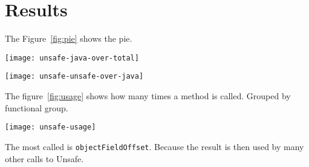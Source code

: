 
\section{Results} \label{sec:results}

The Figure~\ref{fig:pie} shows the pie.

\begin{figure*}[htb]
\centering
\vspace{-1cm}
\texttt{[image: unsafe-java-over-total]}
\caption{Project using unsafe}
\label{fig:pie}
\end{figure*}

\begin{figure*}[htb]
\centering
\vspace{-1cm}
\texttt{[image: unsafe-unsafe-over-java]}
\caption{Project using unsafe}
\label{fig:pie}
\end{figure*}


The figure~\ref{fig:usage} shows how many times a method is called. Grouped by functional group.

\begin{figure*}[htb]
\texttt{[image: unsafe-usage]}
\caption{sun.misc.Unsafe methods usage}
\label{fig:usage}
\end{figure*}

The most called is \texttt{objectFieldOffset}. Because the result is then used by many other calls to Unsafe.




